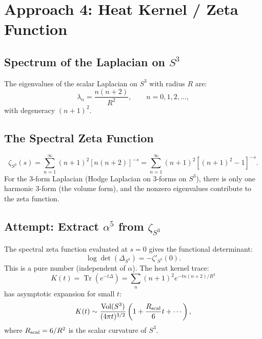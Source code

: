 \documentclass[11pt]{article}
\theoremstyle{definition}
\theoremstyle{remark}
\newcommand{\Tr}{\operatorname{Tr}}
\newcommand{\Vol}{\operatorname{Vol}}
\begin{document}
\section{Approach 4: Heat Kernel / Zeta Function}
\label{sec:zeta}

\subsection{Spectrum of the Laplacian on $S^3$}

The eigenvalues of the scalar Laplacian on $S^3$ with radius $R$ are:
\begin{equation}
\lambda_n = \frac{n(n+2)}{R^2}, \qquad n = 0, 1, 2, \ldots,
\end{equation}
with degeneracy $(n+1)^2$.

\subsection{The Spectral Zeta Function}

\begin{equation}
\zeta_{S^3}(s) = \sum_{n=1}^{\infty} (n+1)^2 [n(n+2)]^{-s}
  = \sum_{n=1}^{\infty} (n+1)^2 [(n+1)^2 - 1]^{-s}.
\end{equation}
For the 3-form Laplacian (Hodge Laplacian on 3-forms on $S^3$), there is only
one harmonic 3-form (the volume form), and the nonzero eigenvalues contribute
to the zeta function.

\subsection{Attempt: Extract $\alpha^5$ from $\zeta_{S^3}$}

The spectral zeta function evaluated at $s = 0$ gives the functional determinant:
\begin{equation}
\log\det(\Delta_{S^3}) = -\zeta'_{S^3}(0).
\end{equation}
This is a pure number (independent of $\alpha$). The heat kernel trace:
\begin{equation}
K(t) = \Tr(e^{-t\Delta}) = \sum_n (n+1)^2 e^{-tn(n+2)/R^2}
\end{equation}
has asymptotic expansion for small $t$:
\begin{equation}
K(t) \sim \frac{\Vol(S^3)}{(4\pi t)^{3/2}} \left(1 + \frac{R_{\rm scal}}{6} t + \cdots\right),
\end{equation}
where $R_{\rm scal} = 6/R^2$ is the scalar curvature of $S^3$.
\end{document}
